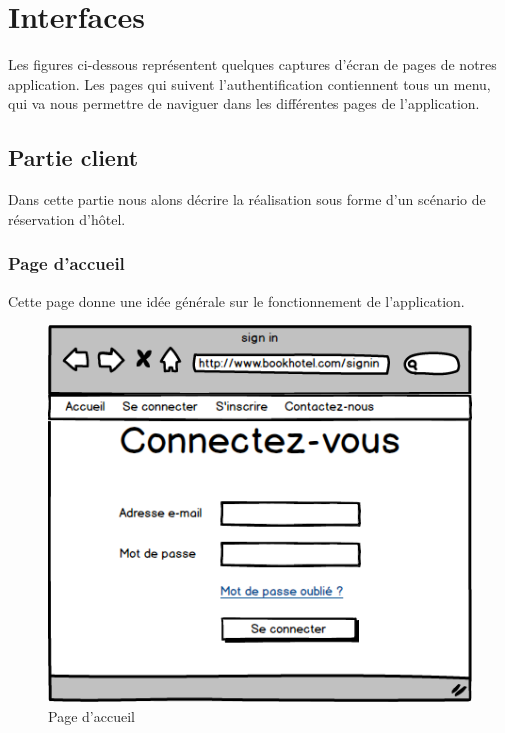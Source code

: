 \documentclass[12pt,a4paper]{report}
\begin{document}
	\section{Interfaces}
Les figures ci-dessous représentent quelques captures d’écran de pages de notres application. Les pages qui suivent l’authentification contiennent tous un menu, qui va nous permettre de naviguer dans les différentes pages de l'application.\\
	\subsection{Partie client}
Dans cette partie nous alons décrire la réalisation sous forme d’un scénario de réservation d'hôtel.
	\newpage
	\subsubsection{Page d'accueil}
Cette page donne une idée générale sur le fonctionnement de l'application.
	\vspace{2cm}
	\begin{figure}[!hbtp]
		\centering
		\includegraphics[scale=0.2]{./graphics/1.png}
		\caption{Page d'accueil}
		\end{figure}
		\newpage
\end{document}
